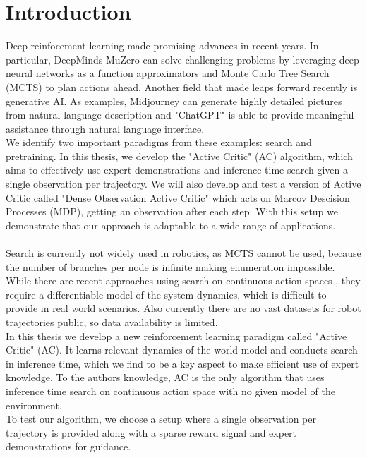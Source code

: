\chapter{Introduction}
\label{chapter:Introduction}
Deep reinfocement learning made promising advances in recent years. In particular, DeepMinds MuZero \cite{MUZero} can solve challenging problems by leveraging deep neural networks as a function 
approximators and Monte Carlo Tree Search (MCTS) to plan actions ahead. 
Another field that made leaps forward recently is generative AI. As examples, Midjourney \cite{midjourney} 
can generate highly detailed pictures from natural 
language description and "ChatGPT" is able to provide meaningful assistance through natural language interface. \\
We identify two important paradigms from these examples: search and pretraining. In this thesis, we develop the "Active Critic" (AC) algorithm, which aims to effectively use 
expert demonstrations and inference time search given a single observation per trajectory. 
We will also develop and test a version of Active Critic called "Dense Observation Active Critic" which acts on Marcov Descision Processes (MDP), getting an observation after each step. With this setup we 
demonstrate that our approach is adaptable to a wide range of applications.\\ \\
Search is currently not widely used in robotics, as MCTS cannot be used, because the number of branches per node is infinite making enumeration impossible. While there are recent approaches 
using search on continuous action spaces \cite{Manna2022} \cite{Lee_Jeon_Kim_Kim_2020}, they require a differentiable model of the system dynamics, which is difficult to provide in real world scenarios. 
Also currently there are no vast datasets for robot trajectories public, so data availability is limited.\\ 
In this thesis we develop a new reinforcement learning 
paradigm called "Active Critic" (AC). It learns relevant dynamics of the world model and conducts search in inference time, which we find to be a key aspect 
to make efficient use of expert knowledge. To the authors knowledge, AC is the only algorithm that uses inference time search on continuous action space with no given model of the environment.\\

To test our algorithm, we choose a setup where a single observation per trajectory is provided along with a sparse reward signal and expert demonstrations for guidance. \\

